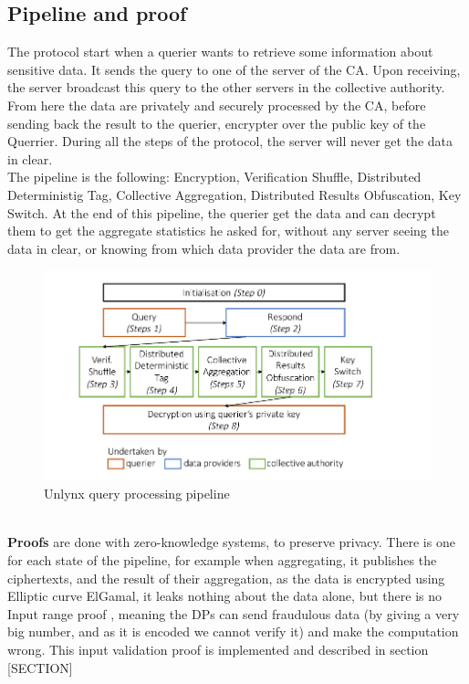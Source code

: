 \documentclass{article}
\begin{document}
\subsection{Pipeline and proof}
The protocol start when a querier wants to retrieve some information about sensitive data. It sends the query to one of the server of the CA. Upon receiving, the server broadcast this query to the other servers in the collective authority.\\
From here the data are privately and securely processed by the CA, before sending back the result to the querier, encrypter over the public key of the Querrier. During all the steps of the protocol, the server will never get the data in clear.\\
The pipeline is the following: Encryption, Verification Shuffle, Distributed Deterministig Tag, Collective Aggregation, Distributed Results Obfuscation, Key Switch. At the end of this pipeline, the querier get the data and can decrypt them to get the aggregate statistics he asked for, without any server seeing the data in clear, or knowing from which data provider the data are from.
\begin{figure}[h]
\centering
\includegraphics[scale=0.5]{img/unlynxPip.png}
\caption{Unlynx query processing pipeline}
\end{figure}
\\
\textbf{Proofs} are done with zero-knowledge systems, to preserve privacy. There is one for each state of the pipeline, for example when aggregating, it publishes the ciphertexts, and the result of their aggregation, as the data is encrypted using Elliptic curve ElGamal, it leaks nothing about the data alone, but there is no Input range proof , meaning the DPs can send fraudulous data (by giving a very big number, and as it is encoded we cannot verify it) and make the computation wrong. This input validation proof is implemented and described in section [SECTION]\\
\end{document}
